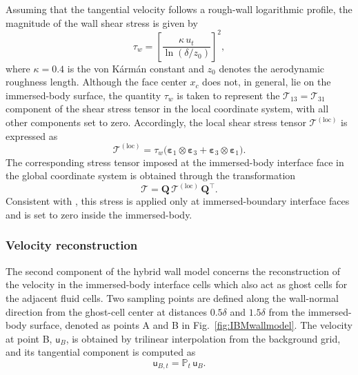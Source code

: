 \documentclass[%
superscriptaddress,
 amsmath,amssymb,
pra,
showkeys,
]{revtex4-2}
\begin{document}
Assuming that the tangential velocity follows a rough-wall logarithmic profile, the magnitude of the wall shear stress is given by
\begin{equation}
\tau_w
=
\left[
\frac{\kappa\,u_t}{\ln\!\left(\delta/z_0\right)}
\right]^2 ,
\label{eq:IBM_tau_final}
\end{equation}
where $\kappa = 0.4$ is the von K\'arm\'an constant and $z_0$ denotes the aerodynamic roughness length.
Although the face center $x_c$ does not, in general, lie on the immersed-body surface, the quantity $\tau_w$ is taken to represent the $\mathcal{T}_{13} = \mathcal{T}_{31}$ component of the shear stress tensor in the local coordinate system, with all other components set to zero. Accordingly, the local shear stress tensor $\mathcal{T}^{(\mathrm{loc})}$ is expressed as
\begin{equation}
\mathcal{T}^{(\mathrm{loc})}
=
\tau_w
\big(
\boldsymbol{\varepsilon}_1 \otimes \boldsymbol{\varepsilon}_3
+
\boldsymbol{\varepsilon}_3 \otimes \boldsymbol{\varepsilon}_1
\big).
\end{equation}
The corresponding stress tensor imposed at the immersed-body interface face in the global coordinate system
is obtained through the transformation
\begin{equation}
\mathcal{T}
=
\mathbf{Q}\,
\mathcal{T}^{(\mathrm{loc})}\,
\mathbf{Q}^{\!\top}.
\end{equation}
Consistent with \citet{liu2020wall}, this stress is applied only at immersed-boundary interface faces and is set to zero inside the immersed-body.

\subsubsection{Velocity reconstruction}
The second component of the hybrid wall model concerns the reconstruction of the velocity in the immersed-body interface cells which also act as ghost cells for the adjacent fluid cells. Two sampling points are defined along the wall-normal direction from the ghost-cell center at distances $0.5\delta$ and $1.5\delta$ from the immersed-body surface, denoted as points A and B in Fig.~\ref{fig:IBMwallmodel}. The velocity at point B, $\boldsymbol{\mathsf{u}}_B$, is obtained by trilinear interpolation from the background grid, and its tangential component is computed as
\begin{equation}
\boldsymbol{\mathsf{u}}_{B,t}
=
\mathbb{P}_t\,\boldsymbol{\mathsf{u}}_B .
\end{equation}
\end{document}
